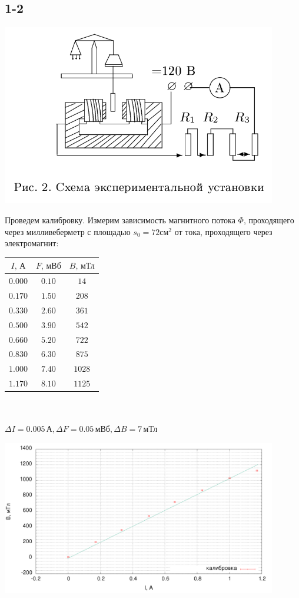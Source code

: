 \subsection*{1-2}
\begin{center}
\includegraphics[width=0.90\textwidth]{setup.png}
\end{center}
Проведем калибровку. Измерим зависимость магнитного потока $\Phi$, проходящего через милливеберметр с площадью $s_0 = 72\text{см}^2$ от тока, проходящего через электромагнит:
\begin{center}
\begin{tabular}{|c|c|c|}\hline
$I\text{, А}$&$F\text{, мВб}$&$B\text{, мТл}$\\\hline
$0.000$&$0.10$&$14$\\\hline
$0.170$&$1.50$&$208$\\\hline
$0.330$&$2.60$&$361$\\\hline
$0.500$&$3.90$&$542$\\\hline
$0.660$&$5.20$&$722$\\\hline
$0.830$&$6.30$&$875$\\\hline
$1.000$&$7.40$&$1028$\\\hline
$1.170$&$8.10$&$1125$\\\hline
\end{tabular}\\~\\
$\Delta I=0.005\,\text{А}, \Delta F=0.05\,\text{мВб}, \Delta B=7\,\text{мТл}$
\end{center}



\begin{center}
\includegraphics[width=0.90\textwidth]{plot.png}
\end{center}

